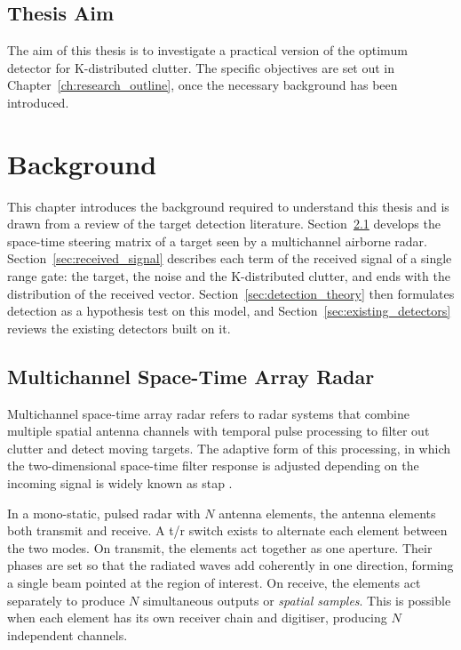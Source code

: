\documentclass[12pt, a4paper]{report}
\begin{document}
\section{Thesis Aim}
\label{sec:aim}
The aim of this thesis is to investigate a practical version of the optimum detector for K-distributed clutter. The specific objectives are set out in Chapter~\ref{ch:research_outline}, once the necessary background has been introduced.

\newpage
\chapter{Background}
\label{ch:background}
This chapter introduces the background required to understand this thesis and is drawn from a review of the target detection literature. Section~\ref{sec:stap} develops the space-time steering matrix of a target seen by a multichannel airborne radar. Section~\ref{sec:received_signal} describes each term of the received signal of a single range gate: the target, the noise and the K-distributed clutter, and ends with the distribution of the received vector. Section~\ref{sec:detection_theory} then formulates detection as a hypothesis test on this model, and Section~\ref{sec:existing_detectors} reviews the existing detectors built on it.

\section{Multichannel Space-Time Array Radar}
\label{sec:stap}
Multichannel space-time array radar refers to radar systems that combine multiple spatial antenna channels with temporal pulse processing to filter out clutter and detect moving targets. The adaptive form of this processing, in which the two-dimensional space-time filter response is adjusted depending on the incoming signal is widely known as \gls{stap} \cite{Melvin2004}. 

In a mono-static, pulsed radar with $N$ antenna elements, the antenna elements both transmit and receive. A \gls{t/r} switch exists to alternate each element between the two modes. On transmit, the elements act together as one aperture. Their phases are set so that the radiated waves add coherently in one direction, forming a single beam pointed at the region of interest. On receive, the elements act separately to produce $N$ simultaneous outputs or \emph{spatial samples}. This is possible when each element has its own receiver chain and digitiser, producing $N$ independent channels.\\
\end{document}
